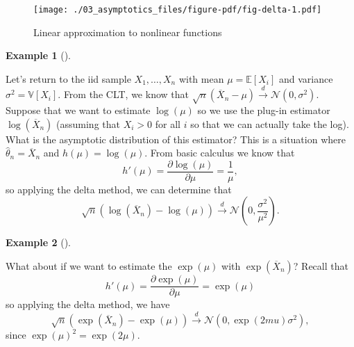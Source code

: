 \documentclass[
  letterpaper,
  DIV=11,
  numbers=noendperiod]{scrreprt}
\newcommand{\E}{\mathbb{E}}
\newcommand{\V}{\mathbb{V}}
\newcommand{\N}{\mathcal{N}}
\newcommand{\Xbar}{\overline{X}}
\newcommand{\indist}{\overset{d}{\to}}
\theoremstyle{definition}
\theoremstyle{plain}
\theoremstyle{definition}
\newtheorem{example}{Example}[chapter]
\theoremstyle{remark}
\begin{document}
\begin{figure}

{\centering \texttt{[image: ./03\_asymptotics\_files/figure-pdf/fig-delta-1.pdf]}

}

\caption{\label{fig-delta}Linear approximation to nonlinear functions}

\end{figure}

\leavevmode{}%
\begin{example}[]\label{exm-log}

Let's return to the iid sample \(X_1, \ldots, X_n\) with mean
\(\mu = \E[X_i]\) and variance \(\sigma^2 = \V[X_i]\). From the CLT, we
know that \(\sqrt{n}(\Xbar_n - \mu) \indist \N(0, \sigma^2)\). Suppose
that we want to estimate \(\log(\mu)\) so we use the plug-in estimator
\(\log(\Xbar_n)\) (assuming that \(X_i > 0\) for all \(i\) so that we
can actually take the log). What is the asymptotic distribution of this
estimator? This is a situation where \(\widehat{\theta}_n = \Xbar_n\)
and \(h(\mu) = \log(\mu)\). From basic calculus we know that \[
h'(\mu) = \frac{\partial \log(\mu)}{\partial \mu} = \frac{1}{\mu},
\] so applying the delta method, we can determine that \[
\sqrt{n}\left(\log(\Xbar_n) - \log(\mu)\right) \indist \N\left(0,\frac{\sigma^2}{\mu^2} \right).
\]

\end{example}

\leavevmode{}%
\begin{example}[]\label{exm-exp}

What about if we want to estimate the \(\exp(\mu)\) with
\(\exp(\Xbar_n)\)? Recall that \[
h'(\mu) = \frac{\partial \exp(\mu)}{\partial \mu} = \exp(\mu)
\] so applying the delta method, we have \[
\sqrt{n}\left(\exp(\Xbar_n) - \exp(\mu)\right) \indist \N(0, \exp(2mu)\sigma^2),
\] since \(\exp(\mu)^2 = \exp(2\mu)\).

\end{example}
\end{document}
